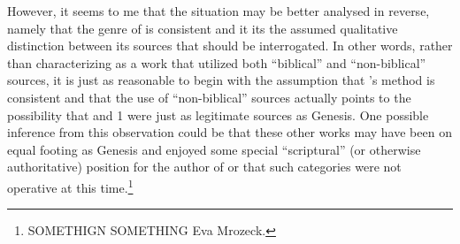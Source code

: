 However, it seems to me that the situation may be better analysed in reverse, namely that the genre of \ga is consistent and it its the assumed qualitative distinction between its sources that should be interrogated. In other words, rather than characterizing \ga as a work that utilized both ``biblical'' and ``non-biblical'' sources, it is just as reasonable to begin with the assumption that \ga's method is consistent and that the use of ``non-biblical'' sources actually points to the possibility that \jub and 1 \enoch were just as legitimate sources as Genesis. One possible inference from this observation could be that these other works may have been on equal footing as Genesis and enjoyed some special ``scriptural'' (or otherwise authoritative) position for the author of \ga or that such categories were  not operative at this time.\footnote{SOMETHIGN SOMETHING Eva Mrozeck.}











